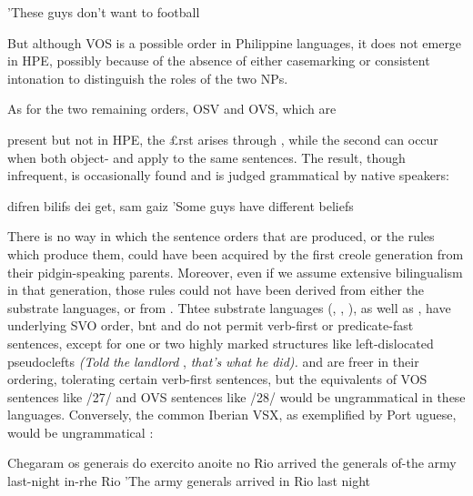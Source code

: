 'These guys don't want to  football

But although VOS is a possible order in Philippine languages, it does not emerge in HPE, possibly because of the absence of either case\-marking or consistent intonation to distinguish the roles of the two NPs.

As for the two remaining orders, OSV and OVS, which are

present  but not in HPE, the £rst arises through , while the second can occur when both object- and  apply to the same sentences. The result, though infrequent, is occasion\-ally found and is judged grammatical by native speakers:

\ea\label{ex:28}
 difren bilifs dei get, sam gaiz 'Some guys have different beliefs
\glt
\z

There is no way in which the sentence orders that are produced, or the rules which produce them, could have been acquired by the first creole generation from their pidgin-speaking parents. Moreover, even if we assume extensive bilingualism in that generation, those rules could not have been derived from either the substrate languages, or from . Thtee substrate languages (, , ), as well as  , have underlying SVO order, bnt  and  do not permit verb-first or predicate-fast sentences, except for one or two highly marked structures like  left-dislocated pseudo\-clefts \textit{(Told} \textit{the} \textit{landlord} , \textit{that's} \textit{what} \textit{he} \textit{did)}\textit{.}  and  are freer in their ordering, tolerating certain  verb-first sen\-tences, but the equivalents of VOS sentences like /27/ and OVS sen\-tences like /28/ would be ungrammatical in these languages. Conversely, the common Iberian VSX, as exemplified by Port uguese, would be ungrammatical :

\ea\label{ex:29}
 Chegaram os generais do exercito anoite no Rio arrived the generals of-the army last-night in-rhe Rio 'The army generals arrived in Rio last night
\glt
\z


